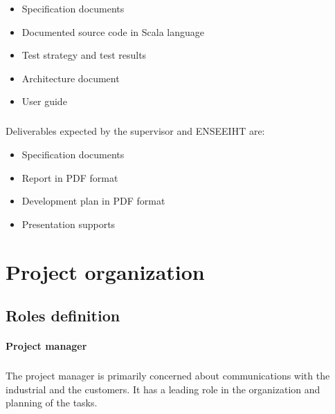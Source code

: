 \documentclass{report}
\begin{document}
\vspace{3mm}
\begin{itemize}
\item Specification documents\vspace{1mm}
\item Documented source code in Scala language\vspace{1mm}
\item Test strategy and test results\vspace{1mm}
\item Architecture document\vspace{1mm}
\item User guide\vspace{1mm}
\end{itemize}

\paragraph{}
\hspace{4mm}\textnormal{Deliverables expected by the supervisor and ENSEEIHT are:}

\vspace{3mm}
\begin{itemize}
\item Specification documents\vspace{1mm}
\item Report in PDF format\vspace{1mm}
\item Development plan in PDF format\vspace{1mm}
\item Presentation supports\vspace{1mm}
\end{itemize}

\chapter{Project organization}

\section{Roles definition}

\subsubsection{Project manager}

\paragraph{}
\hspace{4mm}\textnormal{The project manager is primarily concerned about communications with the industrial and the customers. It has a leading role in the organization and planning of the tasks.}
\end{document}
